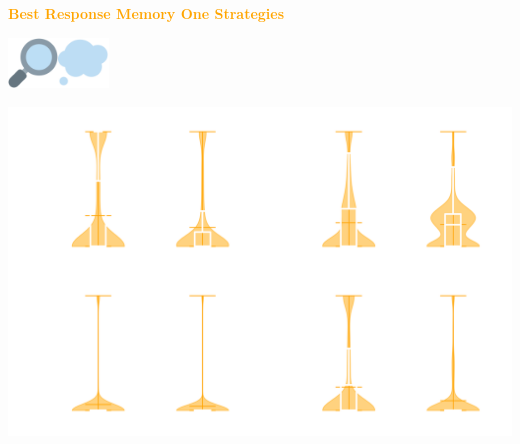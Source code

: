 \documentclass{beamer}
\begin{document}
\begin{frame}
    \begin{center}
    \textcolor{orange}{\large{\textbf{Best Response Memory One Strategies}}} \vspace{1cm}

    \includegraphics[width=0.10\textwidth]{static/look.png}\hspace{2pt}\includegraphics[width=0.10\textwidth]{static/memone.png}
    \end{center}
\end{frame}

\begin{frame}
    \begin{center}
    
    \end{center}
\end{frame}

\begin{frame}
    \begin{center}
    
    \end{center}
\end{frame}

\begin{frame}
    \begin{center}
    \includegraphics[width=.8\textwidth]{static/mem_one_violin.png}
    \end{center}
\end{frame}
\end{document}

